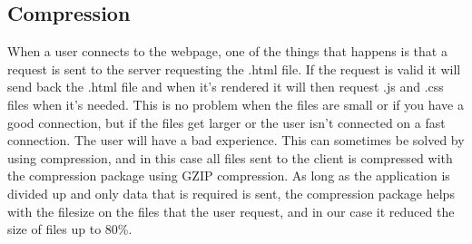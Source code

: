 \subsection{Compression}
When a user connects to the webpage, one of the things that happens is that a request is sent to the server requesting the .html file. If the request is valid it will send back the .html file and when it's rendered it will then request .js and .css files when it's needed. This is no problem when the files are small or if you have a good connection, but if the files get larger or the user isn't connected on a fast connection. The user will have a bad experience. This can sometimes be solved by using compression, and in this case all files sent to the client is compressed with the compression package using GZIP compression. As long as the application is divided up and only data that is required is sent, the compression package helps with the filesize on the files that the user request, and in our case it reduced the size of files up to 80\%.